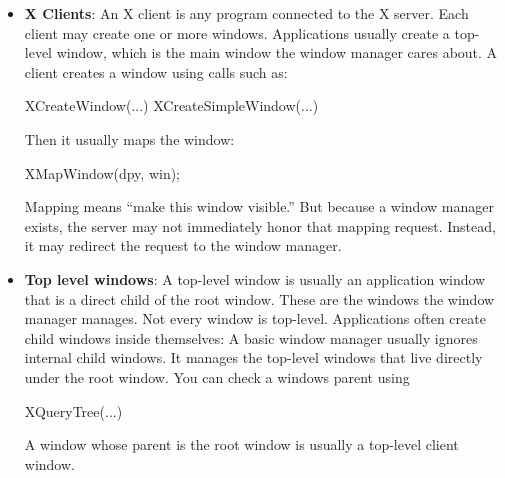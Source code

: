 \documentclass{report}
\begin{document}
\begin{itemize}
            \begin{cppcode}
                Window root = DefaultRootWindow(dpy);
            \end{cppcode}
            That root value is not a C object containing the window. It is an ID you send back to the X server when making requests.
            \bigbreak \noindent 
            Xlib calls such as \textbf{XMoveWindow,} \textbf{XResizeWindow,} \textbf{XMapWindow,} and XDestroyWindow send requests to the server. They do not directly manipulate local objects.
        \item \textbf{X Clients}: An X client is any program connected to the X server.
            \bigbreak \noindent 
            Each client may create one or more windows. Applications usually create a top-level window, which is the main window the window manager cares about.
            \bigbreak \noindent 
            A client creates a window using calls such as:
            \bigbreak \noindent 
            \begin{cppcode}
                XCreateWindow(...)
                XCreateSimpleWindow(...)
            \end{cppcode}
            \bigbreak \noindent 
            Then it usually maps the window:
            \bigbreak \noindent 
            \begin{cppcode}
            XMapWindow(dpy, win);
            \end{cppcode}
            \bigbreak \noindent 
            Mapping means “make this window visible.” But because a window manager exists, the server may not immediately honor that mapping request. Instead, it may redirect the request to the window manager.
        \item \textbf{Top level windows}: A top-level window is usually an application window that is a direct child of the root window. These are the windows the window manager manages.
            \bigbreak \noindent 
            Not every window is top-level. Applications often create child windows inside themselves:
            \bigbreak \noindent 
            A basic window manager usually ignores internal child windows. It manages the top-level windows that live directly under the root window.
            \bigbreak \noindent 
            You can check a windows parent using
            \bigbreak \noindent 
            \begin{cppcode}
            XQueryTree(...)
            \end{cppcode}
            \bigbreak \noindent 
            A window whose parent is the root window is usually a top-level client window.

\end{itemize}
\end{document}
